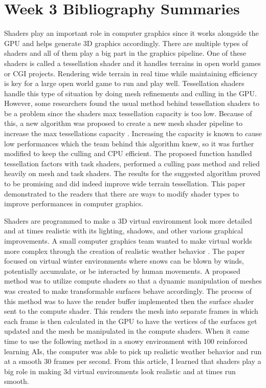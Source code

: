 \documentclass{article}
\begin{document}
\section{Week 3 Bibliography Summaries}

Shaders play an important role in computer graphics since it works alongside the GPU and helps generate 3D graphics accordingly. There are multiple types of shaders and all of them play a big part in the graphics pipeline. One of these shaders is called a tessellation shader and it handles terrains in open world games or CGI projects. Rendering wide terrain in real time while maintaining efficiency is key for a large open world game to run and play well. Tessellation shaders handle this type of situation by doing mesh refinements and culling in the GPU. However, some researchers found the usual method behind tessellation shaders to be a problem since the shaders max tessellation capacity is too low. Because of this, a new algorithm was proposed to create a new mesh shader pipeline to increase the max tessellations capacity \cite{9122336}. Increasing the capacity is known to cause low performances which the team behind this algorithm knew, so it was further modified to keep the culling and CPU efficient. The proposed function handled tessellation factors with task shaders, performed a culling pass method and relied heavily on mesh and task shaders. The results for the suggested algorithm proved to be promising and did indeed improve wide terrain tessellation. This paper demonstrated to the readers that there are ways to modify shader types to improve performances in computer graphics.

Shaders are programmed to make a 3D virtual environment look more detailed and at times realistic with its lighting, shadows, and other various graphical improvements. A small computer graphics team wanted to make virtual worlds more complex through the creation of  realistic weather behavior \cite{10.1145/3402942.3402995}. The paper focused on virtual winter environments where snows can be blown by winds, potentially accumulate, or be interacted by human movements. A proposed method was to utilize compute shaders so that a dynamic manipulation of meshes was created to make transformable surfaces behave accordingly. The process of this method was to have the render buffer implemented then the surface shader sent to the compute shader. This renders the mesh into separate frames in which each frame is then calculated in the GPU to have the vertices of the surfaces get updated and the mesh be manipulated in the compute shaders. When it came time to use the following method in a snowy environment with 100 reinforced learning AIs, the computer was able to pick up realistic weather behavior and run at a smooth 30 frames per second. From this article, I learned that shaders play a big role in making 3d virtual environments look realistic and at times run smooth.
\end{document}

